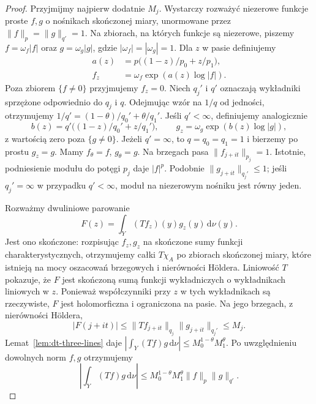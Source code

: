 \begin{proof}
Przyjmijmy najpierw dodatnie $M_j$. Wystarczy rozważyć
niezerowe funkcje proste $f,g$ o nośnikach skończonej
miary, unormowane przez $\|f\|_p=\|g\|_{q'}=1$.
Na zbiorach, na których funkcje są niezerowe, piszemy
$f=\omega_f|f|$ oraz $g=\omega_g|g|$, gdzie
$|\omega_f|=|\omega_g|=1$. Dla $z$ w pasie definiujemy
\[
\begin{aligned}
 a(z)&=p\bigl((1-z)/p_0+z/p_1\bigr),\\
 f_z&=\omega_f\exp(a(z)\log|f|).
\end{aligned}
\]
Poza zbiorem $\{f\ne0\}$ przyjmujemy $f_z=0$.
Niech $q_j'$ i $q'$ oznaczają wykładniki sprzężone
odpowiednio do $q_j$ i $q$. Odejmując wzór na $1/q$
od jedności, otrzymujemy
$1/q'=(1-\theta)/q_0'+\theta/q_1'$.
Jeśli $q'<\infty$, definiujemy analogicznie
\[
 b(z)=q'\bigl((1-z)/q_0'+z/q_1'\bigr),
 \qquad
 g_z=\omega_g\exp(b(z)\log|g|),
\]
z wartością zero poza $\{g\ne0\}$.
Jeżeli $q'=\infty$, to $q=q_0=q_1=1$ i bierzemy
po prostu $g_z=g$.
Mamy $f_\theta=f$, $g_\theta=g$. Na brzegach pasa
$\|f_{j+it}\|_{p_j}=1$. Istotnie, podniesienie
modułu do potęgi $p_j$ daje $|f|^p$.
Podobnie $\|g_{j+it}\|_{q_j'}\le1$; jeśli
$q_j'=\infty$ w przypadku $q'<\infty$, moduł
na niezerowym nośniku jest równy jeden.

Rozważmy dwuliniowe parowanie
\[
 F(z)=\int_Y (Tf_z)(y)g_z(y)\,\mathrm d\nu(y).
\]
Jest ono skończone: rozpisując $f_z,g_z$ na skończone
sumy funkcji charakterystycznych, otrzymujemy całki
$T\chi_A$ po zbiorach skończonej miary, które istnieją
na mocy oszacowań brzegowych i nierówności Höldera.
Liniowość $T$ pokazuje, że $F$ jest skończoną sumą
funkcji wykładniczych o wykładnikach liniowych w $z$.
Ponieważ współczynniki przy $z$ w tych wykładnikach
są rzeczywiste, $F$ jest holomorficzna i ograniczona
na pasie. Na jego brzegach, z nierówności Höldera,
\[
 |F(j+it)|\le
 \|Tf_{j+it}\|_{q_j}\|g_{j+it}\|_{q_j'}\le M_j.
\]
Lemat~\ref{lem:dt-three-lines} daje
$|\int_Y (Tf)g\,\mathrm d\nu|\le M_0^{1-\theta}M_1^\theta$.
Po uwzględnieniu dowolnych norm $f,g$ otrzymujemy
\[
 \left|\int_Y(Tf)g\,\mathrm d\nu\right|
 \le M_0^{1-\theta}M_1^\theta\|f\|_p\|g\|_{q'}.
\]


\end{proof}
